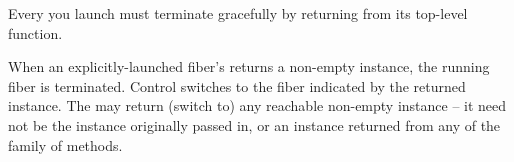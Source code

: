 
Every \fiber you launch must
terminate gracefully by returning from its top-level function.

When an explicitly-launched fiber's \entryfn returns a non-empty \fiber
instance, the running fiber is terminated. Control switches to the fiber
indicated by the returned \fiber instance. The \entryfn may return (switch to)
any reachable non-empty \fiber instance -- it need not be the instance originally
passed in, or an instance returned from any of the \resume family of
methods.

